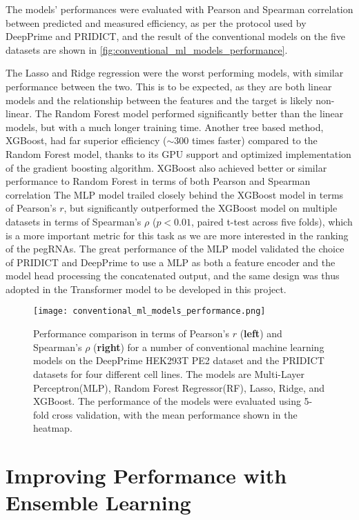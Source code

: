 The models' performances were evaluated with Pearson and Spearman correlation between predicted and measured efficiency, as per the protocol used by DeepPrime and PRIDICT, and the result of the conventional models on the five datasets are shown in \autoref{fig:conventional_ml_models_performance}. 

The Lasso and Ridge regression were the worst performing models, with similar performance between the two. This is to be expected, as they are both linear models and the relationship between the features and the target is likely non-linear. The Random Forest model performed significantly better than the linear models, but with a much longer training time. Another tree based method, XGBoost, had far superior efficiency ($\sim$300 times faster) compared to the Random Forest model, thanks to its GPU support and optimized implementation of the gradient boosting algorithm. XGBoost also achieved better or similar performance to Random Forest in terms of both Pearson and Spearman correlation The MLP model trailed closely behind the XGBoost model in terms of Pearson's $r$, but significantly outperformed the XGBoost model on multiple datasets in terms of Spearman's $\rho$ ($p<0.01$, paired t-test across five folds), which is a more important metric for this task as we are more interested in the ranking of the pegRNAs. The great performance of the MLP model validated the choice of PRIDICT and DeepPrime to use a MLP as both a feature encoder and the model head processing the concatenated output, and the same design was thus adopted in the Transformer model to be developed in this project.

\begin{figure}
    \centering
    \texttt{[image: conventional\_ml\_models\_performance.png]}
    \caption[Conventional ML model performance comparison]{Performance comparison in terms of Pearson's $r$ (\textbf{left}) and Spearman's $\rho$ (\textbf{right}) for a number of conventional machine learning models on the DeepPrime HEK293T PE2 dataset and the PRIDICT datasets for four different cell lines. The models are Multi-Layer Perceptron(MLP), Random Forest Regressor(RF), Lasso, Ridge, and XGBoost. The performance of the models were evaluated using 5-fold cross validation, with the mean performance shown in the heatmap.}
    \label{fig:conventional_ml_models_performance}
\end{figure}


\section{Improving Performance with Ensemble Learning}
\label{sec:ensemble}


